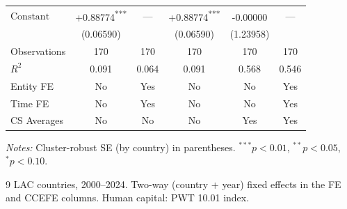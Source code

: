 \begin{table}[htbp]
\begin{tabular}{lccccc}
$\text{Constant}$ & +0.88774\textsuperscript{***} & --- & +0.88774\textsuperscript{***} & -0.00000\textsuperscript{} & --- \\
 & (0.06590) &  & (0.06590) & (1.23958) &  \\[2pt]
\midrule
Observations & 170 & 170 & 170 & 170 & 170 \\
$R^2$ & 0.091 & 0.064 & 0.091 & 0.568 & 0.546 \\
Entity FE & No & Yes & No & No & Yes \\
Time FE & No & Yes & No & No & Yes \\
CS Averages & No & No & No & Yes & Yes \\
\bottomrule
\end{tabular}
\begin{tablenotes}
\footnotesize
\item \textit{Notes:} Cluster-robust SE (by country) in parentheses. $^{***}p<0.01$, $^{**}p<0.05$, $^{*}p<0.10$.
\item 9 LAC countries, 2000--2024. Two-way (country + year) fixed effects in the FE and CCEFE columns. Human capital: PWT 10.01 index.
\end{tablenotes}
\end{table}
